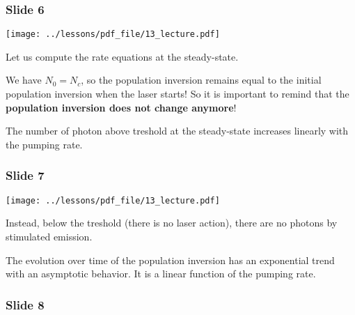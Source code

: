 \documentclass[../main/main.tex]{subfiles}
\begin{document}
\subsubsection*{Slide 6}

\begin{minipage}[]{0.5\linewidth}
\centering
\texttt{[image: ../lessons/pdf\_file/13\_lecture.pdf]}
\end{minipage}
\hspace{0.3cm}\vspace{0.3cm}
\begin{minipage}[c]{0.47\linewidth}

Let us compute the rate equations at the steady-state.

We have \( N_0 = N_c \), so the population inversion remains equal to the initial population inversion when the laser starts! So it is important to remind that the \textbf{population inversion does not change anymore}!

The number of photon above treshold at the steady-state increases linearly with the pumping rate.

\end{minipage}

\newpage

\subsubsection*{Slide 7}

\begin{minipage}[]{0.5\linewidth}
\centering
\texttt{[image: ../lessons/pdf\_file/13\_lecture.pdf]}
\end{minipage}
\hspace{0.3cm}\vspace{0.3cm}
\begin{minipage}[c]{0.47\linewidth}

Instead, below the treshold (there is no laser action), there are no photons by stimulated emission.

The evolution over time of the population inversion has an exponential trend with an asymptotic behavior. It is a linear function of the pumping rate.

\end{minipage}

\subsubsection*{Slide 8}
\end{document}
